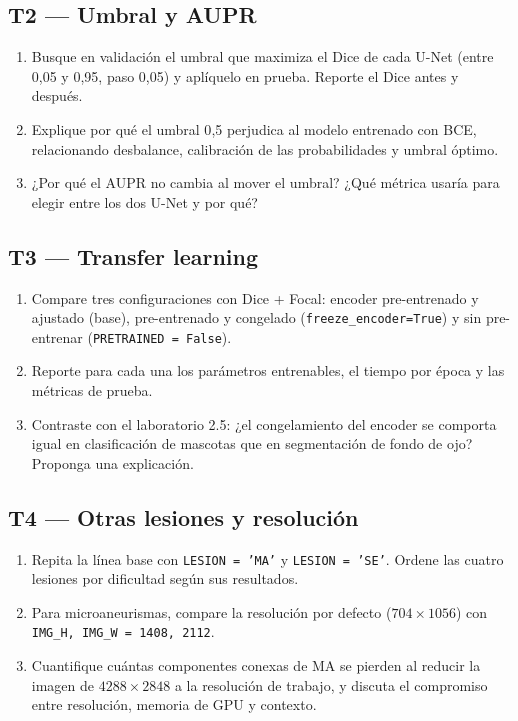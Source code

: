 \documentclass[11pt, a4paper]{article}
\newcommand{\enlace}[1]{\par\vspace{2pt}{\footnotesize\color{StanfordGray}%
	$\hookrightarrow$\  #1}}
\begin{document}
\subsection*{T2 --- Umbral y AUPR}
\begin{enumerate}
	\item Busque en validaci\'on el umbral que maximiza el Dice de cada U-Net (entre 0{,}05 y 0{,}95, paso 0{,}05) y apl\'iquelo en prueba. Reporte el Dice antes y despu\'es.
	\item Explique por qu\'e el umbral 0{,}5 perjudica al modelo entrenado con BCE, relacionando desbalance, calibraci\'on de las probabilidades y umbral \'optimo.
	\item ¿Por qu\'e el AUPR no cambia al mover el umbral? ¿Qu\'e m\'etrica usar\'ia para elegir entre los dos U-Net y por qu\'e?
\end{enumerate}

\subsection*{T3 --- Transfer learning}
\begin{enumerate}
	\item Compare tres configuraciones con Dice + Focal: encoder pre-entrenado y ajustado (base), pre-entrenado y congelado (\texttt{freeze\_encoder=True}) y sin pre-entrenar (\texttt{PRETRAINED = False}).
	\item Reporte para cada una los par\'ametros entrenables, el tiempo por \'epoca y las m\'etricas de prueba.
	\item Contraste con el laboratorio 2.5: ¿el congelamiento del encoder se comporta igual en clasificaci\'on de mascotas que en segmentaci\'on de fondo de ojo? Proponga una explicaci\'on.
\end{enumerate}

\subsection*{T4 --- Otras lesiones y resolución}
\begin{enumerate}
	\item Repita la l\'inea base con \texttt{LESION = 'MA'} y \texttt{LESION = 'SE'}. Ordene las cuatro lesiones por dificultad seg\'un sus resultados.
	\item Para microaneurismas, compare la resoluci\'on por defecto ($704 \times 1056$) con \texttt{IMG\_H, IMG\_W = 1408, 2112}.
	\item Cuantifique cu\'antas componentes conexas de MA se pierden al reducir la imagen de $4288 \times 2848$ a la resoluci\'on de trabajo, y discuta el compromiso entre resoluci\'on, memoria de GPU y contexto.
\end{enumerate}
\end{document}
